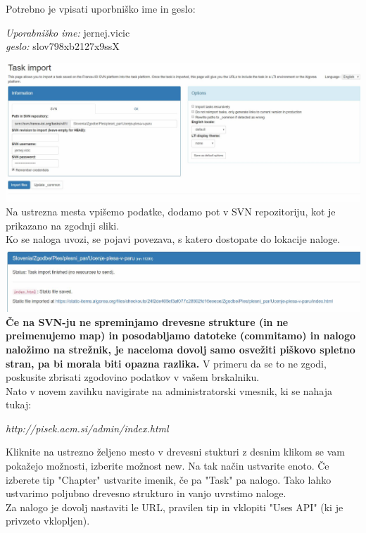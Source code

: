 \documentclass[11pt]{article} %
\begin{document}
Potrebno je vpisati uporbniško ime in geslo:\\

\begin{center}
\textit{Uporabniško ime: }  jernej.vicic\\
\textit{geslo: } slov798xb2127x9ssX\\
\end{center}
\includegraphics[scale=0.5]{objavljanje_nalog}\\[0.5cm]
Na ustrezna mesta vpišemo podatke, dodamo pot v SVN repozitoriju, kot je prikazano na zgodnji sliki.\\

Ko se naloga uvozi, se pojavi povezava, s katero dostopate do lokacije naloge.\\
\includegraphics[scale=0.5]{povezava}\\[0.5cm]

\textbf{Če na SVN-ju ne spreminjamo drevesne strukture (in ne preimenujemo map) in posodabljamo datoteke (commitamo) in nalogo naložimo na strežnik, je naceloma dovolj samo osvežiti piškovo spletno stran, pa bi morala biti opazna razlika.}
V primeru  da se to ne zgodi, poskusite zbrisati zgodovino podatkov v vašem brskalniku.\\[0.5cm]

Nato v novem zavihku navigirate na administratorski vmesnik, ki se nahaja tukaj: 

\begin{center}
\textit{http://pisek.acm.si/admin/index.html}
\end{center}

Kliknite na ustrezno željeno mesto v drevesni stukturi z desnim klikom se vam pokažejo možnosti, izberite možnost new. Na tak način ustvarite enoto. Če izberete tip "Chapter" ustvarite imenik, če pa "Task" pa nalogo. Tako lahko ustvarimo poljubno drevesno strukturo in vanjo uvrstimo
naloge.\\

Za nalogo je dovolj nastaviti le URL, pravilen tip in vklopiti "Uses API" (ki
je privzeto vklopljen).
\end{document}

